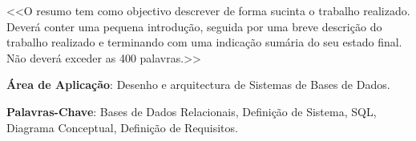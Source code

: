 \documentclass[a4paper,12pt]{scrreprt}
\begin{document}


\makecover



    
    






\renewenvironment{abstract}
 {\par\noindent\textbf{\Large\abstractname}\par\bigskip}
 {}

\begin{flushleft}
\begin{abstract}
    <<O resumo tem como objectivo descrever de forma sucinta o trabalho realizado. Deverá conter uma pequena introdução, seguida por uma breve descrição do trabalho realizado e terminando com uma indicação sumária do seu estado final. Não deverá exceder as 400 palavras.>> 
    \par \textbf{Área de Aplicação}: Desenho e arquitectura de Sistemas de Bases de Dados.
    \par \textbf{Palavras-Chave}: Bases de Dados Relacionais, Defini\c{c}\~ao de Sistema, SQL, Diagrama Conceptual,
    Defini\c{c}\~ao de Requisitos.
\end{abstract}
\end{flushleft}
\end{document}
